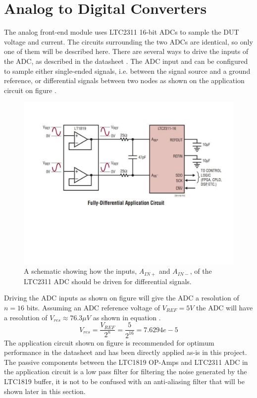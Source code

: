 \section{Analog to Digital Converters} \label{subsec:ADCs}
The analog front-end module uses LTC2311\cite{ADC_LTC2311} 16-bit ADCs to sample the DUT voltage and current. The circuits surrounding the two ADCs are identical, so only one of them will be described here. There are several ways to drive the inputs of the ADC, as described in the datasheet \cite{ADC_LTC2311}. 
The ADC input and can be configured to sample either single-ended signals, i.e. between the signal source and a ground reference, or differential signals between two nodes as shown on the application circuit on figure .

\begin{figure}[H]
    \centering
    \includegraphics[clip, trim=0 200 0 50, width=1\textwidth]{Sections/7_SystemDesign/Figures/7_1_ADC_FULLDIFFINPUT.pdf}
    \caption{A schematic showing how the inputs, $A_{IN+}$ and $A_{IN-}$, of the LTC2311 ADC should be driven \cite{ADC_LTC2311} for differential signals.}
    \label{fig_7_1_DRIVEADC}
\end{figure}

Driving the ADC inputs as shown on figure  will give the ADC a resolution of $n = 16$ bits. Assuming an ADC reference voltage of $V_{REF} = 5 V$ the ADC will have a resolution of $V_{res} \approx 76.3 \mu V$ as shown in equation . 
\begin{equation}\label{eq:7_1_2_ADCRES}
    V_{res} = \frac{V_{REF}}{2^n} = \frac{5}{2^{16}} = 7.6294e-5
\end{equation}
The application circuit shown on figure  is recommended for optimum performance in the datasheet and has been directly applied as-is in this project. The passive components between the LTC1819 OP-Amps and LTC2311 ADC in the application circuit is a low pass filter for filtering the noise generated by the LTC1819 buffer, it is not to be confused with an anti-aliasing filter that will be shown later in this section.

